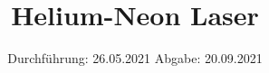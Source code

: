 

\subject{V 61}
\title{Helium-Neon Laser}
\date{%
  Durchführung: 26.05.2021
  \hspace{3em}
  Abgabe: 20.09.2021
}



\maketitle
\thispagestyle{empty}
\tableofcontents
\newpage








\printbibliography{}


